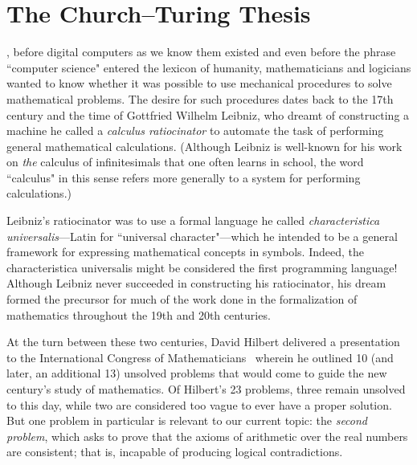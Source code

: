 \section{The Church--Turing Thesis}\label{sec:churchturingthesis}

, before digital computers as we know them existed and even before the phrase ``computer science" entered the lexicon of humanity, mathematicians and logicians wanted to know whether it was possible to use mechanical procedures to solve mathematical problems. The desire for such procedures dates back to the 17th century and the time of Gottfried Wilhelm Leibniz, who dreamt of constructing a machine he called a \emph{calculus ratiocinator} to automate the task of performing general mathematical calculations. (Although Leibniz is well-known for his work on \emph{the} calculus of infinitesimals that one often learns in school, the word ``calculus" in this sense refers more generally to a system for performing calculations.)

Leibniz's ratiocinator was to use a formal language he called \emph{characteristica universalis}---Latin for ``universal character"---which he intended to be a general framework for expressing mathematical concepts in symbols. Indeed, the characteristica universalis might be considered the first programming language! Although Leibniz never succeeded in constructing his ratiocinator, his dream formed the precursor for much of the work done in the formalization of mathematics throughout the 19th and 20th centuries.

At the turn between these two centuries, David Hilbert delivered a presentation to the International Congress of Mathematicians~\citeyearpar{Hilbert1900MathematischeProbleme, Hilbert1901MathematischeProbleme} wherein he outlined 10 (and later, an additional 13) unsolved problems that would come to guide the new century's study of mathematics. Of Hilbert's 23 problems, three remain unsolved to this day, while two are considered too vague to ever have a proper solution. But one problem in particular is relevant to our current topic: the \emph{second problem}, which asks to prove that the axioms of arithmetic over the real numbers are consistent; that is, incapable of producing logical contradictions.

